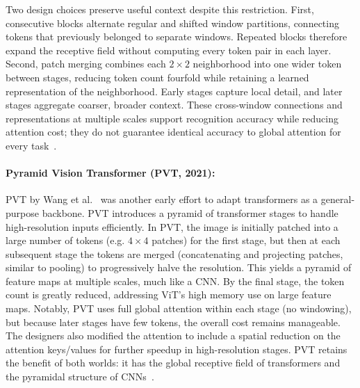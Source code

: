 \documentclass[runningheads,a4paper]{llncs}
\begin{document}
Two design choices preserve useful context despite this restriction. First, consecutive blocks alternate regular and shifted window partitions, connecting tokens that previously belonged to separate windows. Repeated blocks therefore expand the receptive field without computing every token pair in each layer. Second, patch merging combines each $2\times2$ neighborhood into one wider token between stages, reducing token count fourfold while retaining a learned representation of the neighborhood. Early stages capture local detail, and later stages aggregate coarser, broader context. These cross-window connections and representations at multiple scales support recognition accuracy while reducing attention cost; they do not guarantee identical accuracy to global attention for every task~\cite{liu2021swin}.

\paragraph{Pyramid Vision Transformer (PVT, 2021):} PVT by Wang et al.~\cite{wang2021pvt} was another early effort to adapt transformers as a general-purpose backbone. PVT introduces a pyramid of transformer stages to handle high-resolution inputs efficiently. In PVT, the image is initially patched into a large number of tokens (e.g. $4\times4$ patches) for the first stage, but then at each subsequent stage the tokens are merged (concatenating and projecting patches, similar to pooling) to progressively halve the resolution. This yields a pyramid of feature maps at multiple scales, much like a CNN. By the final stage, the token count is greatly reduced, addressing ViT’s high memory use on large feature maps. Notably, PVT uses full global attention within each stage (no windowing), but because later stages have few tokens, the overall cost remains manageable. The designers also modified the attention to include a spatial reduction on the attention keys/values for further speedup in high-resolution stages. PVT retains the benefit of both worlds: it has the global receptive field of transformers and the pyramidal structure of CNNs~\cite{wang2021pvt}.
\end{document}
